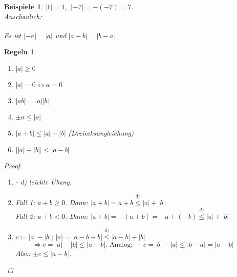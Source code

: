 \documentclass{extreport}
\theoremstyle{named}
\theoremstyle{dotless}
\newtheorem*{beispiele}{Beispiele}
\newtheorem*{regeln}{Regeln}
\begin{document}
\begin{beispiele}
	$|1| = 1$, $~|-7| = -(-7) = 7$. \\
		Anschaulich:   \\ \\
	Es ist $|-a| = |a|$ und $|a - b| = |b - a|$
\end{beispiele}


\begin{regeln} ~\
	\begin{enumerate}
		\item $|a| \geq 0$
		\item $|a| = 0 \iff a = 0$
		\item $|ab| = |a||b|$
		\item $\pm a \leq |a|$
		\item $|a + b| \leq |a| + |b|$ (Dreiecksungleichung)
		\item $\left| |a| - |b| \right| \leq |a - b|$
	\end{enumerate}	

	\begin{proof} ~\
	  \begin{enumerate}
		\item[a)]- d) leichte Übung.
		\item[e)] Fall 1: $a +b \geq 0$. Dann: $|a + b| = a + b \overset{d)}{\leq} |a| + |b|$. \\
			Fall 2: $a + b < 0$. Dann: $|a + b| = - (a + b) = - a + (- b) \overset{d)}{\leq} |a| + |b|$.
		\item[f)] $c \coloneqq |a| - |b|$; $|a| = |a - b + b| \overset{d)}{\leq} |a - b | + |b|$
			$$
				\Rightarrow c = |a| - |b| \leq |a - b|. \text{ Analog: } -c = |b| - |a| \leq |b - a| = |a - b| 
			$$
			Also: $\pm c \leq |a - b|$.
	  \end{enumerate}
	\end{proof}
\end{regeln}
\end{document}
